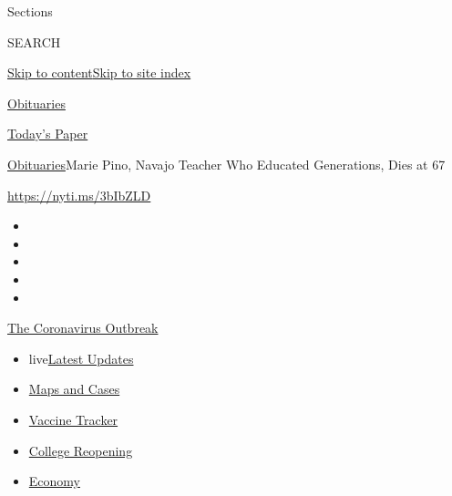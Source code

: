 Sections

SEARCH

\protect\hyperlink{site-content}{Skip to
content}\protect\hyperlink{site-index}{Skip to site index}

\href{https://www.nytimes3xbfgragh.onion/section/obituaries}{Obituaries}

\href{https://myaccount.nytimes3xbfgragh.onion/auth/login?response_type=cookie\&client_id=vi}{}

\href{https://www.nytimes3xbfgragh.onion/section/todayspaper}{Today's
Paper}

\href{/section/obituaries}{Obituaries}\textbar{}Marie Pino, Navajo
Teacher Who Educated Generations, Dies at 67

\url{https://nyti.ms/3bIbZLD}

\begin{itemize}
\item
\item
\item
\item
\item
\end{itemize}

\href{https://www.nytimes3xbfgragh.onion/news-event/coronavirus?action=click\&pgtype=Article\&state=default\&region=TOP_BANNER\&context=storylines_menu}{The
Coronavirus Outbreak}

\begin{itemize}
\tightlist
\item
  live\href{https://www.nytimes3xbfgragh.onion/2020/08/04/world/coronavirus-covid-19.html?action=click\&pgtype=Article\&state=default\&region=TOP_BANNER\&context=storylines_menu}{Latest
  Updates}
\item
  \href{https://www.nytimes3xbfgragh.onion/interactive/2020/us/coronavirus-us-cases.html?action=click\&pgtype=Article\&state=default\&region=TOP_BANNER\&context=storylines_menu}{Maps
  and Cases}
\item
  \href{https://www.nytimes3xbfgragh.onion/interactive/2020/science/coronavirus-vaccine-tracker.html?action=click\&pgtype=Article\&state=default\&region=TOP_BANNER\&context=storylines_menu}{Vaccine
  Tracker}
\item
  \href{https://www.nytimes3xbfgragh.onion/2020/08/02/us/covid-college-reopening.html?action=click\&pgtype=Article\&state=default\&region=TOP_BANNER\&context=storylines_menu}{College
  Reopening}
\item
  \href{https://www.nytimes3xbfgragh.onion/live/2020/08/03/business/stock-market-today-coronavirus?action=click\&pgtype=Article\&state=default\&region=TOP_BANNER\&context=storylines_menu}{Economy}
\end{itemize}

